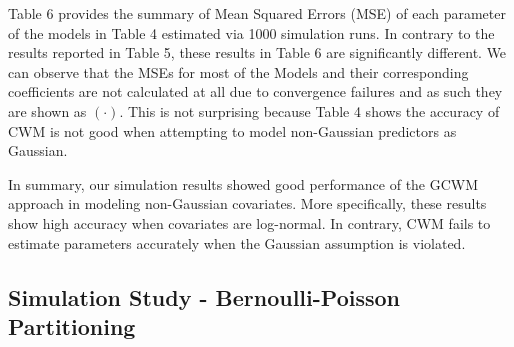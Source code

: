 \documentclass[11pt,letterpaper]{article}
\numberwithin{equation}{section}
\numberwithin{equation}{section}
\numberwithin{equation}{section}
\begin{document}
Table 6 provides the summary of Mean Squared Errors (MSE) of each parameter of the models in Table 4 estimated via 1000 simulation runs.
In contrary to the results reported in Table 5, these results in Table 6 are significantly different. We can observe that the MSEs for most of the Models and their corresponding coefficients are not calculated at all due to convergence failures and as such they are shown as $(\cdot)$. This is not surprising because Table 4 shows the accuracy of CWM is not good when attempting to model non-Gaussian predictors as Gaussian.

In summary, our simulation results showed good performance of the GCWM approach in modeling non-Gaussian covariates. More specifically, these results show high accuracy when covariates are log-normal. In contrary, CWM fails to estimate parameters accurately when the Gaussian assumption is violated.

\subsection{Simulation Study - Bernoulli-Poisson Partitioning}
\end{document}
